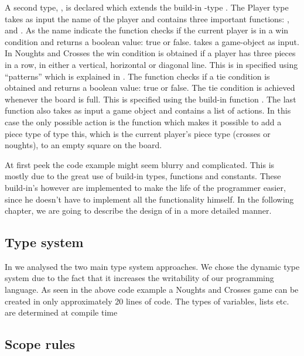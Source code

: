 A second type, , is declared which extends the build-in \productname{}-type . The Player type
takes as input the name of the player and contains three important functions: ,  and 
. As the name indicate the  function checks if the current player is in a win condition and returns
a boolean value: true or false.  takes a game-object as input. In Noughts and Crosses the win condition is obtained if a player has three pieces in a row, in either a vertical, horizontal or diagonal line. This is in \productname{} specified using ``patterns'' which is explained in . The  function checks if a tie condition is obtained and returns a boolean value: true or false. The tie condition is achieved whenever the board is full. This is specified using the build-in function . The last function  also takes as input a game object and contains a list of actions. In this case the only possible action is the  function which makes it possible to add a piece type of type this, which is the current player's piece type (crosses or noughts), to an empty square on the board.

At first peek the code example might seem blurry and complicated. This is mostly due to the great use of build-in
types, functions and constants. These build-in's however are implemented to make the life of the programmer easier, since 
he doesn't have to implement all the functionality himself. In the following chapter, we are going to describe the design of \productname{} in a
more detailed manner.  


\subsection*{Type system}

In  we analysed the two main type system approaches. 
We chose the dynamic type system due to the fact that it increases the writability of our programming language. As seen in the
above code example  a Noughts and Crosses game can be created in only approximately 20 lines
of code. The types of variables, lists etc. are determined at compile time



\subsection*{Scope rules}

